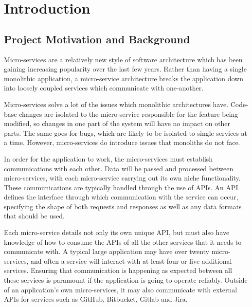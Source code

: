 \chapter{Introduction}
\section{Project Motivation and Background}

Micro-services are a relatively new style of software architecture which has been gaining increasing popularity over the last few years. Rather than having a single monolithic application, a micro-service architecture breaks the application down into loosely coupled services which communicate with one-another. 

Micro-services solve a lot of the issues which monolithic architectures have. Code-base changes are isolated to the micro-service responsible for the feature being modified, so changes in one part of the system will have no impact on other parts. The same goes for bugs, which are likely to be isolated to single services at a time. However, micro-services do introduce issues that monoliths do not face.

In order for the application to work, the micro-services must establish communications with each other. Data will be passed and processed between micro-services, with each micro-service carrying out its own niche functionality. These communications are typically handled through the use of APIs. An API defines the interface through which communication with the service can occur, specifying the shape of both requests and responses as well as any data formats that should be used.

Each micro-service details not only its own unique API, but must also have knowledge of how to consume the APIs of all the other services that it needs to communicate with. A typical large application may have over twenty micro-services, and often a service will interact with at least four or five additional services. Ensuring that communication is happening as expected between all these services is paramount if the application is going to operate reliably. Outside of an application’s own micro-services, it may also communicate with external APIs for services such as GitHub, Bitbucket, Gitlab and Jira.

